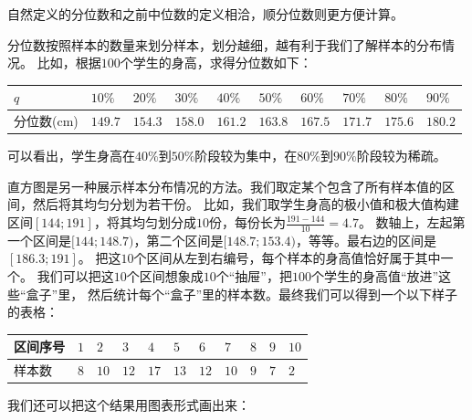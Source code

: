 \documentclass[12pt,UTF8]{ctexbook}
\begin{document}
自然定义的分位数和之前中位数的定义相洽，顺分位数则更方便计算。

分位数按照样本的数量来划分样本，划分越细，越有利于我们了解样本的分布情况。
比如，根据$100$个学生的身高，求得分位数如下：
\begin{center}
    \begin{tabular}{ | p{3.8em}<{\centering} | p{2em}<{\centering} | p{2em}<{\centering} | p{2em}<{\centering} | p{2em}<{\centering} | p{2em}<{\centering} | p{2em}<{\centering} | p{2em}<{\centering} | p{2em}<{\centering} | p{2em}<{\centering} | }
        \hline
            $q$   & $10\%$ & $20\%$ & $30\%$& $40\%$& $50\%$& $60\%$& $70\%$& $80\%$& $90\%$ \\ [0.5ex] 
        \hline
        {\scriptsize 分位数(cm)} & $149.7$ & $154.3$ & $158.0$ & $161.2$ & $163.8$ & $167.5$ & $171.7$ & $175.6$ & $180.2$ \\  
        \hline
    \end{tabular}
\end{center}

可以看出，学生身高在$40\%$到$50\%$阶段较为集中，在$80\%$到$90\%$阶段较为稀疏。


直方图是另一种展示样本分布情况的方法。我们取定某个包含了所有样本值的区间，然后将其均匀分划为若干份。
比如，我们取学生身高的极小值和极大值构建区间$[144;191]$，将其均匀划分成$10$份，每份长为$\frac{191-144}{10}=4.7$。
数轴上，左起第一个区间是$[144;148.7)$，第二个区间是$[148.7;153.4)$，等等。最右边的区间是$[186.3;191]$。
把这$10$个区间从左到右编号，每个样本的身高值恰好属于其中一个。
我们可以把这$10$个区间想象成$10$个“抽屉”，把$100$个学生的身高值“放进”这些“盒子”里，
然后统计每个“盒子”里的样本数。最终我们可以得到一个以下样子的表格：
\begin{center}
    \begin{tabular}{ | p{4em}<{\centering} | p{1.7em}<{\centering} | p{1.7em}<{\centering} | p{1.7em}<{\centering} | p{1.7em}<{\centering} | p{1.7em}<{\centering} | p{1.7em}<{\centering} | p{1.7em}<{\centering} | p{1.7em}<{\centering} | p{1.7em}<{\centering} | p{1.7em}<{\centering} | }
        \hline
        区间序号 & $1$ & $2$  & $3$  & $4$  & $5$  & $6$  & $7$  & $8$ & $9$ & $10$ \\ [0.5ex] 
        \hline
        样本数   & $8$ & $10$ & $12$ & $17$ & $13$ & $12$ & $10$ & $9$ & $7$ & $2$  \\  
        \hline
    \end{tabular}
\end{center}
我们还可以把这个结果用图表形式画出来：
\end{document}
